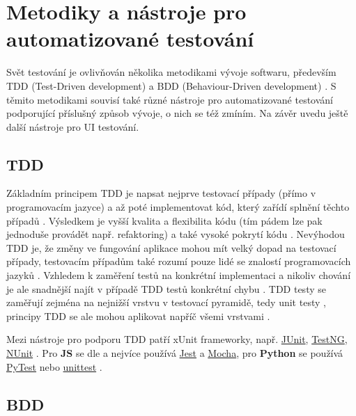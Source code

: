 \section{Metodiky a nástroje pro automatizované testování}

Svět testování je ovlivňován několika metodikami vývoje softwaru, především TDD (Test-Driven development) a BDD (Behaviour-Driven development) \cite{test-swtestinghelp1}. S těmito metodikami souvisí také různé nástroje pro automatizované testování podporující příslušný způsob vývoje, o nich se též zmíním. Na závěr uvedu ještě další nástroje pro UI testování.

\subsection{TDD}

Základním principem TDD je napsat nejprve testovací případy (přímo v programovacím jazyce) a až poté implementovat kód, který zařídí splnění těchto případů \cite{test-swtestinghelp2}. Výsledkem je vyšší kvalita a flexibilita kódu (tím pádem lze pak jednoduše provádět např. refaktoring) a také vysoké pokrytí kódu \cite{test-swtestinghelp2}. Nevýhodou TDD je, že změny ve fungování aplikace mohou mít velký dopad na testovací případy, testovacím případům také rozumí pouze lidé se znalostí programovacích jazyků \cite{test-swtestinghelp2}. Vzhledem k zaměření testů na konkrétní implementaci a nikoliv chování je ale snadnější najít v případě TDD testů konkrétní chybu  \cite{test-swtestinghelp2}. TDD testy se zaměřují zejména na nejnižší vrstvu v testovací pyramidě, tedy unit testy \cite{test-swtestinghelp1}, principy TDD se ale mohou aplikovat napříč všemi vrstvami \cite{test-dzone}.

Mezi nástroje pro podporu TDD patří xUnit frameworky, např. \href{https://junit.org/}{JUnit}, \href{https://testng.org/}{TestNG}, \href{https://nunit.org/}{NUnit} \cite{test-swtestinghelp2}. Pro \textbf{JS} se dle \cite{test-chart-js2} a \cite{test-chart-js1} nejvíce používá \href{https://jestjs.io/}{Jest} a \href{https://mochajs.org/}{Mocha}, pro \textbf{Python} se používá \href{https://docs.pytest.org/en/latest/}{PyTest} nebo \href{https://docs.python.org/3/library/unittest.html}{unittest} \cite{test-chart-python}.

\subsection{BDD}\label{subsec:bdd}

